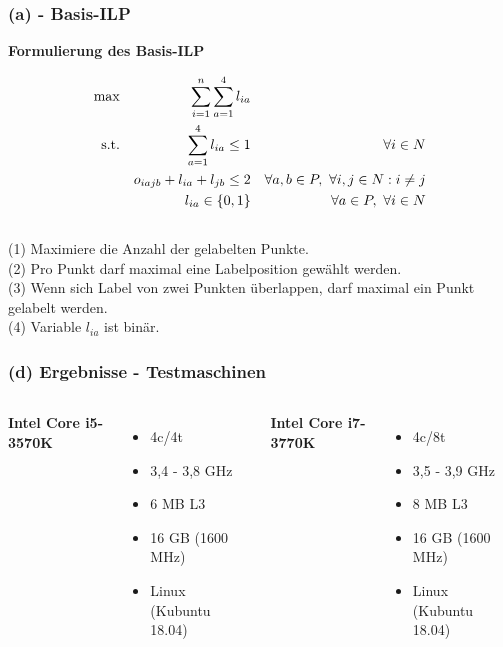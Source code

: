 \documentclass[aspectratio=169]{beamer}
\begin{document}
\begin{frame}
	\frametitle{(a) - Basis-ILP}
	\textbf{Formulierung des Basis-ILP}

	\begin{align}
	\max     && \sum_{i = 1}^n \sum_{a = 1}^4 l_{ia} \\
	\text{s.t.}
					&& \sum_{a = 1}^4 l_{ia} \leq 1                    && \forall i \in N\\
					&&   o_{iajb} + l_{ia} + l_{jb} \leq  2        && \forall a,b \in P,\thinspace \thinspace \forall i,j\in N : i \neq j \\
					&&   l_{ia} \in \{0,1\}                            && \forall a \in P,\thinspace \thinspace \forall i\in N                                      
	\end{align}
	\\
	(1) Maximiere die Anzahl der gelabelten Punkte.\\
	(2) Pro Punkt darf maximal eine Labelposition gewählt werden.\\
	(3) Wenn sich Label von zwei Punkten überlappen, darf maximal ein Punkt gelabelt werden.\\
	(4) Variable $l_{ia}$ ist binär.
	\end{frame}
\begin{frame}
	\frametitle{(d) Ergebnisse - Testmaschinen}
	\begin{columns}[c] %
		
		\textbf{Intel Core i5-3570K}
		\begin{itemize}
			\item 4c/4t
			\item 3,4 - 3,8 GHz
			\item 6 MB L3
			\item 16 GB (1600 MHz)
			\item Linux (Kubuntu 18.04)
			
		\end{itemize}
		
		\textbf{Intel Core i7-3770K}
		\begin{itemize}
			\item 4c/8t
			\item 3,5 - 3,9 GHz
			\item 8 MB L3
			\item 16 GB (1600 MHz)
			\item Linux (Kubuntu 18.04)
			
		\end{itemize}
	
	\end{columns}
	\end{frame}
	
\end{document}
